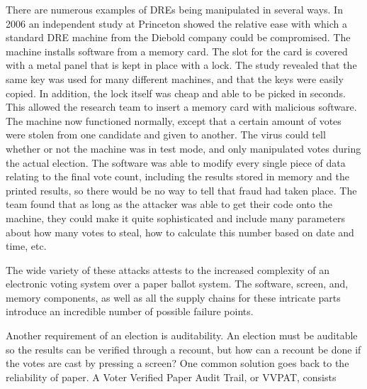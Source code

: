 \documentclass[12pt, titlepage]{article}
\begin{document}
There are numerous examples of DREs being manipulated in several ways. In 2006 an independent study at Princeton showed the relative ease with which a standard DRE machine from the Diebold company could be compromised. \cite{feldman2006security} The machine installs software from a memory card. The slot for the card is covered with a metal panel that is kept in place with a lock. The study revealed that the same key was used for many different machines, and that the keys were easily copied. In addition, the   lock itself was cheap and able to be picked in seconds. This allowed the research team to insert a memory card with malicious software. The machine now functioned normally, except that a certain amount of votes were stolen from one candidate and given to another. The virus could tell whether or not the machine was in test mode, and only manipulated votes during the actual election. The software was able to modify every single piece of data relating to the final vote count, including the results stored in memory and the printed results, so there would be no way to tell that fraud had taken place. The team found that as long as the attacker was able to get their code onto the machine, they could make it quite sophisticated and include many parameters about how many votes to steal, how to calculate this number based on date and time, etc. 


The wide variety of these attacks attests to the increased complexity of an electronic voting system over a paper ballot system. The software, screen, and, memory components, as well as all the supply chains for these intricate parts introduce an incredible number of possible failure points.

Another requirement of an election is auditability. An election must be auditable so the results can be verified through a recount, but how can a recount be done if the votes are cast by pressing a screen? One common solution goes back to the reliability of paper. A Voter Verified Paper Audit Trail, or VVPAT, consists

\newpage
\printbibliography
\end{document}
